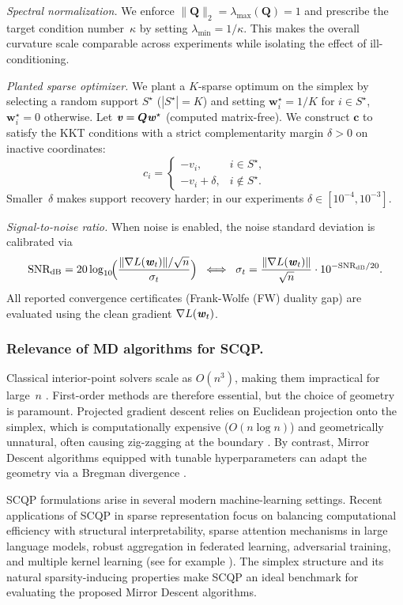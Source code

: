 \documentclass[10pt]{amsart}
\newcommand{\bi}[1]{\textbf{\textit{#1}}}
\newcommand{\bQ}{\boldsymbol{Q}}
\newcommand{\bw}{\boldsymbol{w}}
\theoremstyle{definition}
\theoremstyle{definition}	 %
\begin{document}
\emph{Spectral normalization.}
We enforce $\|\bQ\|_2=\lambda_{\max}(\bQ)=1$ and prescribe the target
condition number~$\kappa$ by setting
$\lambda_{\min}=1/\kappa$.
This makes the overall curvature scale comparable across experiments
while isolating the effect of ill-conditioning.

\emph{Planted sparse optimizer.}
We plant a $K$-sparse optimum on the simplex by selecting a random
support $S^\star$ ($|S^\star|=K$) and setting $\bw^\star_i=1/K$ for
$i\in S^\star$, $\bw^\star_i=0$ otherwise.  Let
$\bi v=\bQ \bi w^\star$ (computed matrix-free).  We construct
$\mathbf{c}$ to satisfy the KKT conditions with a strict
complementarity margin $\delta>0$ on inactive coordinates:
\[
  c_i=
  \begin{cases}
    -v_i, & i\in S^\star,\\
    -v_i+\delta, & i\notin S^\star.
  \end{cases}
\]
Smaller~$\delta$ makes support recovery harder; in our experiments
$\delta\in[10^{-4},10^{-3}]$.

\emph{Signal-to-noise ratio.}
When noise is enabled, the noise standard deviation is calibrated via
\begin{equation}\label{eq:SNR}
  \mathrm{SNR_{dB}}
  =20\log_{10}\!\Bigl(\frac{\|\nabla L(\bi w_t)\|/\sqrt{n}}
  {\sigma_t}\Bigr)
  \;\;\Longleftrightarrow\;\;
  \sigma_t=\frac{\|\nabla L(\bi w_t)\|}{\sqrt{n}}
  \cdot 10^{-\mathrm{SNR_{dB}}/20}.
\end{equation}
All reported convergence certificates (Frank-Wolfe (FW) duality gap) are
evaluated using the clean gradient $\nabla L(\bi w_t)$.

\subsubsection{Relevance of MD algorithms for SCQP.}
Classical interior-point solvers scale as $O(n^3)$, making them
impractical for large~$n$ \cite{Nemirowsky}.  First-order methods are therefore
essential, but the choice of geometry is paramount.  Projected
gradient descent relies on Euclidean projection onto the simplex,
which is computationally expensive ($O(n\log n)$) and geometrically
unnatural, often causing zig-zagging at the boundary \cite{Beck2003,shalev2011}.  By contrast,
Mirror Descent algorithms equipped with tunable hyperparameters can
adapt the geometry via a Bregman divergence \cite{Nemirowsky,MD1}.

SCQP formulations arise in several modern machine-learning settings.  Recent applications of SCQP
 in sparse representation  focus on balancing computational
 efficiency with structural interpretability,
sparse attention mechanisms in large language models,
robust aggregation in federated learning, adversarial
training, and multiple kernel learning (see for example \cite{JMLRsimplex,wei2025sqp,Yang2022}).
The simplex structure and its
natural sparsity-inducing properties make SCQP an ideal benchmark for
evaluating the proposed Mirror Descent algorithms.
\end{document}
